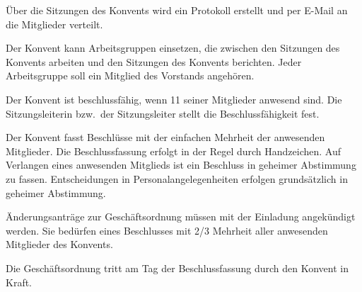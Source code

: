 \documentclass[a4paper, parskip=half, numbers=noenddot]{scrartcl}
\begin{document}
\begin{contract}
Über die Sitzungen des Konvents wird ein Protokoll erstellt und per E-Mail an die Mitglieder verteilt.

Der Konvent kann Arbeitsgruppen einsetzen, die zwischen den Sitzungen des Konvents arbeiten
und den Sitzungen des Konvents berichten.
Jeder Arbeitsgruppe soll ein Mitglied des Vorstands angehören.

\label{par:beschlussfassung}
Der Konvent ist beschlussfähig, wenn 11 seiner Mitglieder anwesend sind. Die Sitzungsleiterin bzw.\ der Sitzungsleiter stellt die Beschlussfähigkeit fest.	

Der Konvent fasst Beschlüsse mit der einfachen Mehrheit der anwesenden Mitglieder. Die
Beschlussfassung erfolgt in der Regel durch Handzeichen. Auf Verlangen eines
anwesenden Mitglieds ist ein Beschluss in geheimer Abstimmung zu fassen. 
Entscheidungen in Personalangelegenheiten erfolgen grundsätzlich in geheimer Abstimmung.
\label{par:beschlussfassung:satz:beschlussfassung}

\label{par:aenderung_der_go}
Änderungsanträge zur Geschäftsordnung müssen mit der Einladung angekündigt werden. Sie
bedürfen eines Beschlusses mit 2/3 Mehrheit aller anwesenden Mitglieder des Konvents.

Die Geschäftsordnung tritt am Tag der Beschlussfassung durch den Konvent in Kraft.


\end{contract}
\end{document}
